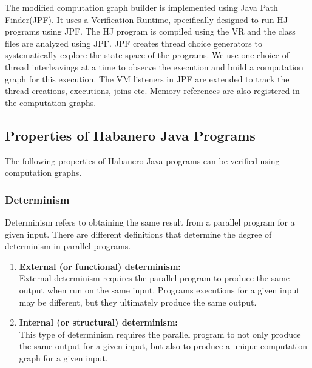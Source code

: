 The modified computation graph builder is implemented using Java Path Finder(JPF). It uses a Verification Runtime, specifically designed to run HJ programs using JPF. The HJ program is compiled using the VR and the class files are analyzed using JPF. JPF creates thread choice generators to systematically explore the state-space of the programs. We use one choice of thread interleavings at a time to observe the execution and build a computation graph for this execution. The VM listeners in JPF are extended to track the thread creations, executions, joins etc. Memory references are also registered in the computation graphs.
\subsection{Properties of Habanero Java Programs}
The following properties of Habanero Java programs can be verified using computation graphs.
\subsubsection{Determinism}
Determinism refers to obtaining the same result from a parallel program for a given input. There are different definitions that determine the degree of determinism in parallel programs.
\begin{enumerate}
\item
\textbf{External (or functional) determinism:\\}
External determinism requires the parallel program to produce the same output when run on the same input. Programs executions for a given input may be different, but they ultimately produce the same output.
\item
\textbf{Internal (or structural) determinism:\\}
This type of determinism requires the parallel program to not only produce the same output for a given input, but also to produce a unique computation graph for a given input.
\end{enumerate}
